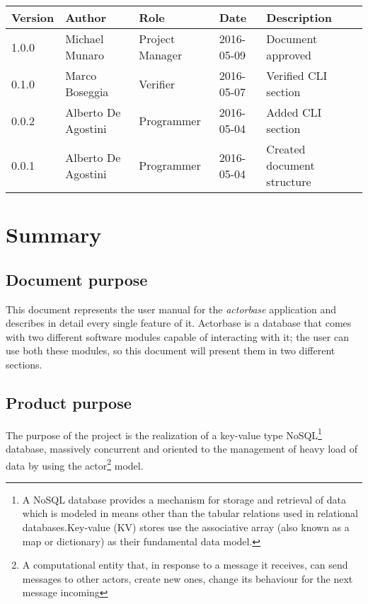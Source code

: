 \documentclass{scalatekids-article}
\begin{document}
\begin{center}
  \begin{longtable}{| l | l | l | l | p{5cm} |}
    \hline
    Version & Author & Role & Date & Description \\
    \hline
    1.0.0 & Michael Munaro & Project Manager & 2016-05-09 & Document approved\\
    \hline
    0.1.0 & Marco Boseggia & Verifier & 2016-05-07 & Verified CLI section\\
    \hline
    0.0.2 & Alberto De Agostini & Programmer & 2016-05-04 & Added CLI section\\
    \hline
    0.0.1 & Alberto De Agostini & Programmer & 2016-05-04 & Created document structure\\
    \hline
  \end{longtable}
\end{center}
\tableofcontents
\newpage
{}
\section{Summary}

\subsection{Document purpose}
This document represents the user manual for the \textit{actorbase} application
and describes in detail every single feature of it. Actorbase is a database that
comes with two different software modules capable of interacting with it; the
user can use both these modules, so this document will present them in two
different sections.

\subsection{Product purpose}

The purpose of the project is the realization of a key-value type
NoSQL\footnote{A NoSQL database provides a mechanism for storage and retrieval
  of data which is modeled in means other than the tabular relations used in
  relational databases.Key-value (KV) stores use the associative array (also known
  as a map or dictionary) as their fundamental data model.\label{nosql}} database,
massively concurrent and oriented to the management of heavy load of data by
using the actor\footnote{A computational entity that, in response to a message
  it receives, can send messages to other actors, create new ones, change its
  behaviour for the next message incoming\label{actor}} model.
\end{document}
